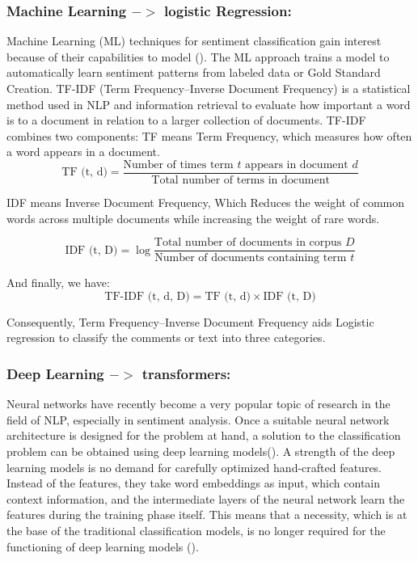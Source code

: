 \documentclass[twoside]{article}
\begin{document}
\subsubsection{Machine Learning $->$ logistic Regression:}
Machine Learning (ML) techniques for sentiment classification gain interest because of their capabilities to model (\cite{Boiy:2008}). The ML approach trains a model to automatically learn sentiment patterns from labeled data or Gold Standard Creation.
TF-IDF (Term Frequency–Inverse Document Frequency) is a statistical method used in NLP and information retrieval to evaluate how important a word is to a document in relation to a larger collection of documents. TF-IDF combines two components:
TF means Term Frequency, which measures how often a word appears in a document.
\begin{equation}
	\text{TF (t, d)} = \frac{\text{Number of times term } t \text{ appears in document } d}{\text{Total number of terms in document}}
\end{equation}

IDF means Inverse Document Frequency, Which Reduces the weight of common words across multiple documents while increasing the weight of rare words.

\begin{equation}
	\text{IDF (t, D)} = \log \frac{\text{Total number of documents in corpus } D}{\text{Number of documents containing term } t}
\end{equation}

And finally, we have:
\begin{equation}
	\text{TF-IDF (t, d, D)} = \text{TF (t, d)} \times \text{IDF (t, D)}
\end{equation}

Consequently, Term Frequency--Inverse Document Frequency aids Logistic regression to classify the comments or text into three categories.

\subsubsection{Deep Learning $->$ transformers:}
Neural networks have recently become a very popular topic of research in the field of NLP, especially in sentiment analysis. Once a suitable neural network architecture is designed for the problem at hand, a solution to the classification problem can be obtained using deep learning models(\cite{Singhal:2016}). A strength of the deep learning models is no demand for carefully optimized hand-crafted features. Instead of the features, they take word embeddings as input, which contain context information, and the intermediate layers of the neural network learn the features during the training phase itself. This means that a necessity, which is at the base of the traditional classification models, is no longer required for the functioning of deep learning models (\cite{Singhal:2016}).
\end{document}

